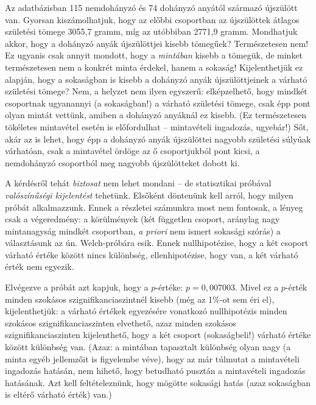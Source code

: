 \documentclass[]{book}
\begin{document}
Az adatbázisban 115 nemdohányzó és 74 dohányzó anyától származó
újszülött van. Gyorsan kiszámolhatjuk, hogy az előbbi csoportban az
újszülöttek átlagos születési tömege 3055,7 gramm, míg az utóbbiban
2771,9 gramm. Mondhatjuk akkor, hogy a dohányzó anyák újszülöttjei
kisebb tömegűek? Természetesen nem! Ez ugyanis csak annyit mondott, hogy
a \emph{mintában} kisebb a tömegük, de minket természetesen nem a
konkrét minta érdekel, hanem a sokaság! Kijelenthetjük ez alapján, hogy
a sokaságban is kisebb a dohányzó anyák újszülöttjeinek a várható
születési tömege? Nem, a helyzet nem ilyen egyszerű: elképzelhető, hogy
mindkét csoportnak ugyanannyi (a sokaságban!) a várható születési
tömege, csak épp pont olyan mintát vettünk, amiben a dohányzó anyáknál
ez kisebb. (Ez természetesen tökéletes mintavétel esetén is előfordulhat
-- mintavételi ingadozás, ugyebár!) Sőt, akár az is lehet, hogy épp a
dohányzó anyák újszülöttei nagyobb születési súlyúak várhatóan, csak a
mintavétel ördöge az ő csoportjukból pont kicsi, a nemdohányzó
csoportból meg nagyobb újszülötteket dobott ki.

A kérdésről tehát \emph{biztosat} nem lehet mondani -- de statisztikai
próbával \emph{valószínűségi kijelentést} tehetünk. Elsőként döntenünk
kell arról, hogy milyen próbát alkalmazzunk. Ennek a részletei számunkra
most nem fontosak, a lényeg csak a végeredmény: a körülmények (két
független csoport, aránylag nagy mintanagyság mindkét csoportban,
\emph{a priori} nem ismert sokasági szórás) a választásunk az ún.
Welch-próbára esik. Ennek nullhipotézise, hogy a két csoport várható
értéke között nincs különbség, ellenhipotézise, hogy van, a két várható
érték nem egyezik.

Elvégezve a próbát azt kapjuk, hogy a \(p\)-értéke: \(p=0,\!007003\).
Mivel ez a \(p\)-érték minden szokásos szignifikanciaszintnél kisebb
(még az 1\%-ot sem éri el), kijelenthetjük: a várható értékek egyezésére
vonatkozó nullhipotézis minden szokásos szignifikanciaszinten elvethető,
azaz minden szokásos szignifikanciaszinten kijelenthető, hogy a két
csoport (sokaságbeli!) várható értéke között különbség van. (Azaz: a
mintában tapasztalt különbség olyan nagy (a minta egyéb jellemzőit is
figyelembe véve), hogy az már túlmutat a mintavételi ingadozás hatásán,
nem hihető, hogy betudható pusztán a mintavételi ingadozás hatásának.
Azt kell feltételeznünk, hogy mögötte sokasági hatás (azaz sokaságban is
eltérő várható érték) van.)
\end{document}
